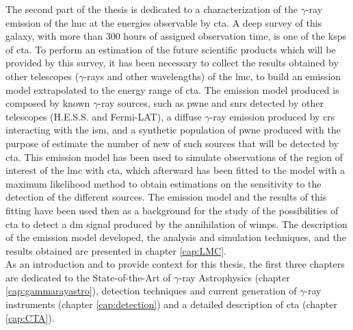 \documentclass[main.tex]{subfiles}
\begin{document}
The second part of the thesis is dedicated to a characterization of the $\gamma$-ray emission of the \gls{lmc} at the energies observable by \gls{cta}. A deep survey of this galaxy, with more than 300 hours of assigned observation time, is one of the \glspl{ksp} of \gls{cta}. To perform an estimation of the future scientific products which will be provided by this survey, it has been necessary to collect the results obtained by other telescopes ($\gamma$-rays and other wavelengths) of the \gls{lmc}, to build an emission model extrapolated to the energy range of \gls{cta}. The emission model produced is composed by known $\gamma$-ray sources, such as \gls{pwne} and \glspl{snr} detected by other telescopes (H.E.S.S. and Fermi-LAT), a diffuse $\gamma$-ray emission produced by \glspl{cr} interacting with the \gls{ism}, and a synthetic population of \gls{pwne} produced with the purpose of estimate the number of new of such sources that will be detected by \gls{cta}. This emission model has been used to simulate observations of the region of interest of the \gls{lmc} with \gls{cta}, which afterward has been fitted to the model with a maximum likelihood method to obtain estimations on the sensitivity to the detection of the different sources. The emission model and the results of this fitting have been used then as a background for the study of the possibilities of \gls{cta} to detect a \gls{dm} signal produced by the annihilation of \glspl{wimp}. The description of the emission model developed, the analysis and simulation techniques, and the results obtained are presented in chapter \ref{cap:LMC}.\\
As an introduction and to provide context for this thesis, the first three chapters are dedicated to the State-of-the-Art of $\gamma$-ray Astrophysics (chapter \ref{cap:gammarayastro}), detection techniques and current generation of $\gamma$-ray instruments (chapter \ref{cap:detection}) and a detailed description of \gls{cta} (chapter \ref{cap:CTA}).
\end{document}
